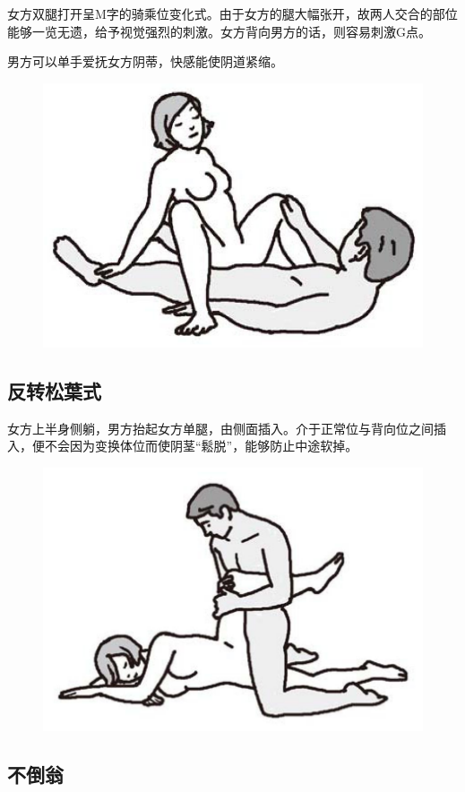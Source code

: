 \documentclass[12pt,UTF8]{ctexbook}
\begin{document}
女方双腿打开呈M字的骑乘位变化式。由于女方的腿大幅张开，故两人交合的部位能够一览无遗，给予视觉强烈的刺激。女方背向男方的话，则容易刺激G点。

男方可以单手爱抚女方阴蒂，快感能使阴道紧缩。

\begin{figure}[htbp]
	\centering
	\includegraphics[width=0.7\linewidth]{tw5}
	\caption{}
	\label{fig:1}
\end{figure}

\subsection{反转松葉式}

女方上半身侧躺，男方抬起女方单腿，由侧面插入。介于正常位与背向位之间插入，便不会因为变换体位而使阴茎“鬆脱”，能够防止中途软掉。

\begin{figure}[htbp]
	\centering
	\includegraphics[width=0.7\linewidth]{tw6}
	\caption{}
	\label{fig:1}
\end{figure}

\subsection{不倒翁}
\end{document}
